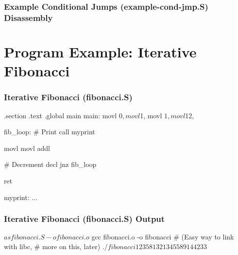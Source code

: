 \documentclass[11pt,xcolor=dvipsnames]{beamer}
\newcommand{\mvs}{\vspace{-0.95em}}
\begin{document}
\begin{frame}[fragile,t]
\frametitle{Example Conditional Jumps (example-cond-jmp.S) Disassembly}
\mvs
{}
\end{frame}

\section{Program Example: Iterative Fibonacci}
\begin{frame}[fragile,t]
\frametitle{Iterative Fibonacci (fibonacci.S)}
\mvs
\begin{gascode}
.section .text
.global main
main:
  movl $0, %
  movl $1, %
  movl $1, %
  movl $12, %

  fib_loop:
    # Print %
    call myprint

    movl %
    movl %
    addl %

    # Decrement %
    decl %
    jnz fib_loop

  ret

myprint:
  ...
\end{gascode}
\end{frame}

\begin{frame}[fragile,t]
\frametitle{Iterative Fibonacci (fibonacci.S) Output}
\mvs
\begin{textcode}
$ as fibonacci.S -o fibonacci.o
$ gcc fibonacci.o -o fibonacci   # (Easy way to link with libc,
                                 #  more on this, later)
$ ./fibonacci
1
2
3
5
8
13
21
34
55
89
144
233
$
\end{textcode}
\end{frame}
\end{document}
